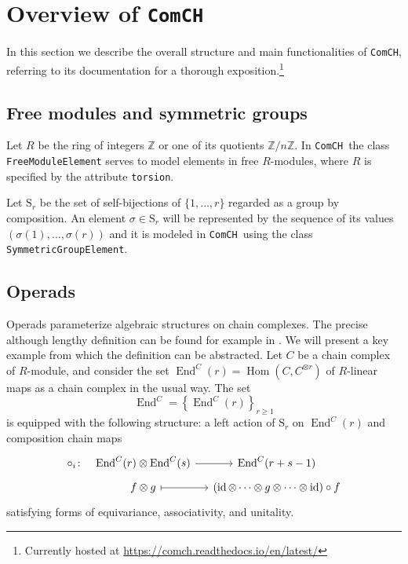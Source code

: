 \documentclass{amsart}
\renewcommand{\S}{\mathrm{S}}
\newcommand{\comch}{\texttt{ComCH}}
\DeclareMathOperator{\id}{id}
\DeclareMathOperator{\Hom}{Hom}
\DeclareMathOperator{\End}{End}
\begin{document}
\tableofcontents

\section{Overview of \comch} \label{s: overview}
In this section we describe the overall structure and main functionalities of \comch, referring to its documentation for a thorough exposition.\footnote{Currently hosted at \url{https://comch.readthedocs.io/en/latest/}}

\subsection{Free modules and symmetric groups}

Let $R$ be the ring of integers $\mathbb Z$ or one of its quotients $\mathbb Z / n \mathbb Z$.
In \comch\, the class \texttt{FreeModuleElement} serves to model elements in free $R$-modules, where $R$ is specified by the attribute \texttt{torsion}.

Let $\S_r$ be the set of self-bijections of $\{1, \dots, r\}$ regarded as a group by composition.
An element $\sigma \in \S_r$ will be represented by the sequence of its values $(\sigma(1), \dots, \sigma(r))$ and it is modeled in \comch\, using the class \texttt{SymmetricGroupElement}.

\subsection{Operads}

Operads parameterize algebraic structures on chain complexes.
The precise although lengthy definition can be found for example in \cite{Markl08}.
We will present a key example from which the definition can be abstracted.
Let $C$ be a chain complex of $R$-module, and consider the set $\End^C(r) =  \Hom(C, C^{\otimes r})$ of $R$-linear maps as a chain complex in the usual way.
The set
\begin{equation*}
\End^C = \left\{\End^C(r)\right\}_{r \geq 1}
\end{equation*}
is equipped with the following structure: a left action of $\S_r$ on $\End^C(r)$ and composition chain maps
\begin{equation*}
\begin{tikzcd}[column sep=small, row sep=tiny]
\circ_i \colon &[-10pt] \End^C(r) \otimes \End^C(s) \arrow[r] & \End^C(r+s-1) \\
& f \otimes g \arrow[r, |->] & (\id \otimes \cdots \otimes g \otimes \cdots \otimes \id) \circ f
\end{tikzcd}
\end{equation*}
satisfying forms of equivariance, associativity, and unitality.
\end{document}
